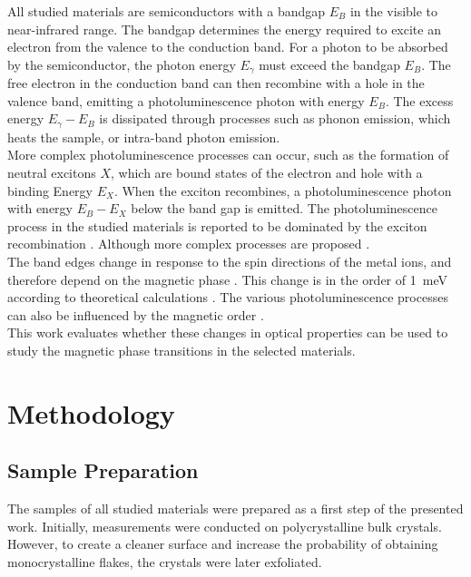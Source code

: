 \documentclass[
	twoside,
	parskip=half,
	a4paper,
]{scrbook}
\begin{document}
All studied materials are semiconductors with a bandgap $E_B$ in the visible to near-infrared range.
The bandgap determines the energy required to excite an electron from the valence to the conduction band.
For a photon to be absorbed by the semiconductor, the photon energy $E_\gamma$ must exceed the bandgap $E_B$.
The free electron in the conduction band can then recombine with a hole in the valence band, emitting a photoluminescence photon with energy $E_B$.
The excess energy $E_\gamma - E_B$ is dissipated through processes such as phonon emission, which heats the sample, or intra-band photon emission.\\
More complex photoluminescence processes can occur, such as the formation of neutral excitons $X$, which are bound states of the electron and hole with a binding Energy $E_X$.
When the exciton recombines, a photoluminescence photon with energy $E_B - E_X$ below the band gap is emitted.
The photoluminescence process in the studied materials is reported to be dominated by the exciton recombination \cite{NiPS3_exciton,MPX_first_principles,NiPS3_anisotropic}.
Although more complex processes are proposed \cite{NiPS3_coherent}.\\
The band edges change in response to the spin directions of the metal ions, and therefore depend on the magnetic phase \cite{MPX_first_principles}.
This change is in the order of \SI{1}{meV} according to theoretical calculations \cite{MPX_first_principles}.
The various photoluminescence processes can also be influenced by the magnetic order \cite{NiPS3_linear}.\\
This work evaluates whether these changes in optical properties can be used to study the magnetic phase transitions in the selected materials.


\chapter{Methodology}
\section{Sample Preparation}
The samples of all studied materials were prepared as a first step of the presented work.
Initially, measurements were conducted on polycrystalline bulk crystals.
However, to create a cleaner surface and increase the probability of obtaining monocrystalline flakes, the crystals were later exfoliated.
\end{document}
